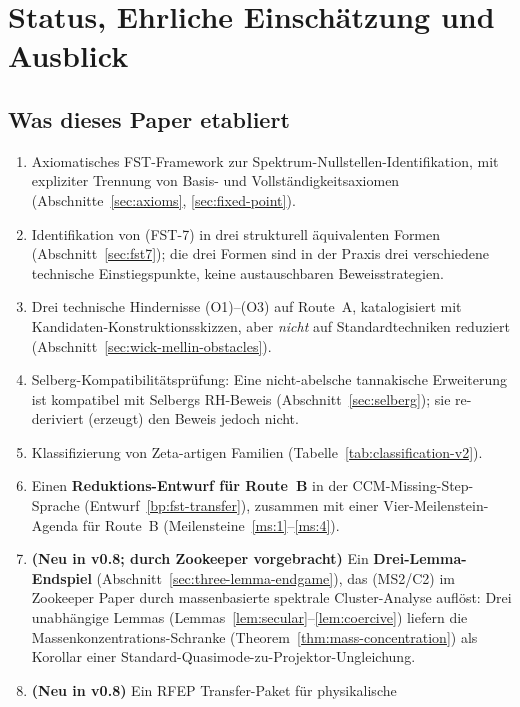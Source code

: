\documentclass[11pt,a4paper]{article}
\theoremstyle{plain}
\theoremstyle{definition}
\begin{document}
\section{Status, Ehrliche Einschätzung und Ausblick}
\label{sec:status}

\subsection{Was dieses Paper etabliert}

\begin{enumerate}[leftmargin=*]
\item Axiomatisches FST-Framework zur Spektrum-Nullstellen-Identifikation,
  mit expliziter Trennung von Basis- und Vollständigkeitsaxiomen
  (Abschnitte~\ref{sec:axioms}, \ref{sec:fixed-point}).
\item Identifikation von (FST-7) in drei strukturell äquivalenten
  Formen (Abschnitt~\ref{sec:fst7}); die drei Formen sind in der Praxis
  drei verschiedene technische Einstiegspunkte, keine austauschbaren
  Beweisstrategien.
\item Drei technische Hindernisse (O1)--(O3) auf Route~A, katalogisiert
  mit Kandidaten-Konstruktionsskizzen, aber \emph{nicht} auf Standardtechniken
  reduziert (Abschnitt~\ref{sec:wick-mellin-obstacles}).
\item Selberg-Kompatibilitätsprüfung: Eine nicht-abelsche tannakische Erweiterung
  ist kompatibel mit Selbergs RH-Beweis
  (Abschnitt~\ref{sec:selberg}); sie re-deriviert (erzeugt) den Beweis jedoch nicht.
\item Klassifizierung von Zeta-artigen Familien
  (Tabelle~\ref{tab:classification-v2}).
\item Einen \textbf{Reduktions-Entwurf für Route~B} in der CCM-Missing-Step-Sprache
  (Entwurf~\ref{bp:fst-transfer}), zusammen mit einer
  Vier-Meilenstein-Agenda für Route~B (Meilensteine~\ref{ms:1}--\ref{ms:4}).
\item \textbf{(Neu in v0.8; durch Zookeeper vorgebracht)} Ein \textbf{Drei-Lemma-Endspiel}
  (Abschnitt~\ref{sec:three-lemma-endgame}), das (MS2/C2) im Zookeeper Paper durch
  massenbasierte spektrale Cluster-Analyse auflöst: Drei unabhängige Lemmas
  (Lemmas~\ref{lem:secular}--\ref{lem:coercive}) liefern die
  Massenkonzentrations-Schranke (Theorem~\ref{thm:mass-concentration})
  als Korollar einer Standard-Quasimode-zu-Projektor-Ungleichung.
\item \textbf{(Neu in v0.8)} Ein RFEP Transfer-Paket für physikalische

\end{enumerate}
\end{document}
